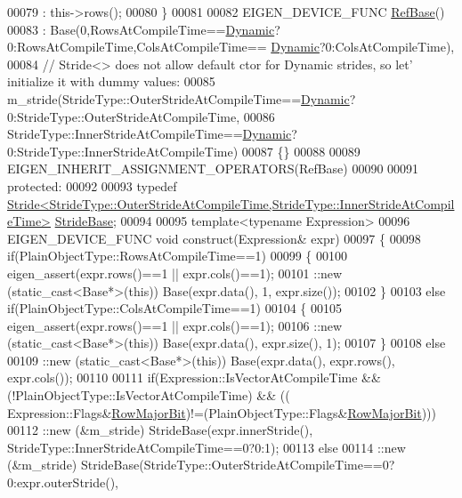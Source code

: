 \begin{DoxyCode}
00079          : this->rows();
00080   \}
00081 
00082   EIGEN\_DEVICE\_FUNC \hyperlink{class_eigen_1_1_ref_base}{RefBase}()
00083     : Base(0,RowsAtCompileTime==\hyperlink{namespace_eigen_ad81fa7195215a0ce30017dfac309f0b2}{Dynamic}?0:RowsAtCompileTime,ColsAtCompileTime==
      \hyperlink{namespace_eigen_ad81fa7195215a0ce30017dfac309f0b2}{Dynamic}?0:ColsAtCompileTime),
00084       \textcolor{comment}{// Stride<> does not allow default ctor for Dynamic strides, so let' initialize it with dummy values:}
00085       m\_stride(StrideType::OuterStrideAtCompileTime==\hyperlink{namespace_eigen_ad81fa7195215a0ce30017dfac309f0b2}{Dynamic}?0:StrideType::OuterStrideAtCompileTime,
00086                StrideType::InnerStrideAtCompileTime==\hyperlink{namespace_eigen_ad81fa7195215a0ce30017dfac309f0b2}{Dynamic}?0:StrideType::InnerStrideAtCompileTime)
00087   \{\}
00088   
00089   EIGEN\_INHERIT\_ASSIGNMENT\_OPERATORS(RefBase)
00090 
00091 \textcolor{keyword}{protected}:
00092 
00093   \textcolor{keyword}{typedef} 
      \hyperlink{group___core___module}{Stride<StrideType::OuterStrideAtCompileTime,StrideType::InnerStrideAtCompileTime>}
       \hyperlink{group___core___module}{StrideBase};
00094 
00095   \textcolor{keyword}{template}<\textcolor{keyword}{typename} Expression>
00096   EIGEN\_DEVICE\_FUNC \textcolor{keywordtype}{void} construct(Expression& expr)
00097   \{
00098     \textcolor{keywordflow}{if}(PlainObjectType::RowsAtCompileTime==1)
00099     \{
00100       eigen\_assert(expr.rows()==1 || expr.cols()==1);
00101       ::new (static\_cast<Base*>(\textcolor{keyword}{this})) Base(expr.data(), 1, expr.size());
00102     \}
00103     \textcolor{keywordflow}{else} \textcolor{keywordflow}{if}(PlainObjectType::ColsAtCompileTime==1)
00104     \{
00105       eigen\_assert(expr.rows()==1 || expr.cols()==1);
00106       ::new (static\_cast<Base*>(\textcolor{keyword}{this})) Base(expr.data(), expr.size(), 1);
00107     \}
00108     else
00109       ::new (static\_cast<Base*>(\textcolor{keyword}{this})) Base(expr.data(), expr.rows(), expr.cols());
00110     
00111     \textcolor{keywordflow}{if}(Expression::IsVectorAtCompileTime && (!PlainObjectType::IsVectorAtCompileTime) && ((
      Expression::Flags&\hyperlink{group__flags_gae4f56c2a60bbe4bd2e44c5b19cbe8762}{RowMajorBit})!=(PlainObjectType::Flags&\hyperlink{group__flags_gae4f56c2a60bbe4bd2e44c5b19cbe8762}{RowMajorBit})))
00112       ::new (&m\_stride) StrideBase(expr.innerStride(), StrideType::InnerStrideAtCompileTime==0?0:1);
00113     else
00114       ::new (&m\_stride) StrideBase(StrideType::OuterStrideAtCompileTime==0?0:expr.outerStride(),

\end{DoxyCode}
